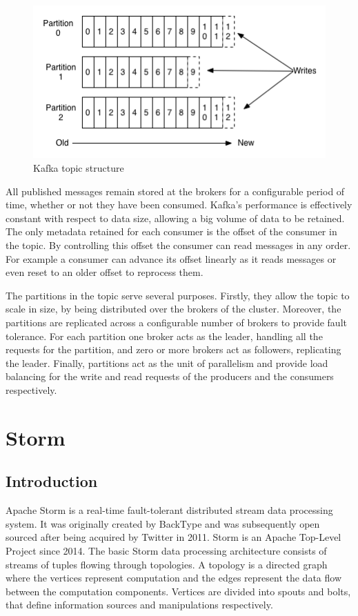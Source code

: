 \begin{figure}[h!]
\centering
\includegraphics{figures/kafka_topic}
\caption{Kafka topic structure}
\label{figure:kafka_topic}
\end{figure}

All published messages remain stored at the brokers for a configurable period of time, whether or not they have been consumed. Kafka's performance is effectively constant with respect to data size, allowing a big volume of data to be retained. The only metadata retained for each consumer is the offset of the consumer in the topic. By controlling this offset the consumer can read messages in any order. For example a consumer can advance its offset linearly as it reads messages or even reset to an older offset to reprocess them.

The partitions in the topic serve several purposes. Firstly, they allow the topic to scale in size, by being distributed over the brokers of the cluster. Moreover, the partitions are replicated across a configurable number of brokers to provide fault tolerance. For each partition one broker acts as the leader, handling all the requests for the partition, and zero or more brokers act as followers, replicating the leader. Finally, partitions act as the unit of parallelism and provide load balancing for the write and read requests of the producers and the consumers respectively.


\section{Storm}

\subsection{Introduction}

Apache Storm \cite{storm,storm_website} is a real-time fault-tolerant distributed stream data processing system. It was originally created by BackType and was subsequently open sourced after being acquired by Twitter in 2011. Storm is an Apache Top-Level Project since 2014. The basic Storm data processing architecture consists of streams of tuples flowing through topologies. A topology is a directed graph where the vertices represent computation and the edges represent the data flow between the computation components. Vertices are divided into spouts and bolts, that define information sources and manipulations respectively.

